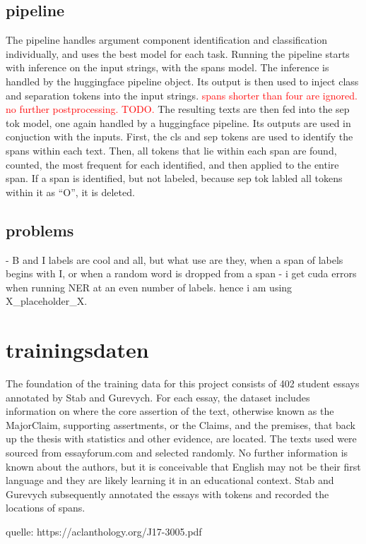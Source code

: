 \documentclass[12]{article}
\theoremstyle{mytheoremstyle}
\theoremstyle{mytheoremstyle}
\theoremstyle{myproblemstyle}
\begin{document}
  \subsection{pipeline} \label{pipeline}
  The pipeline handles argument component identification and classification individually, and uses the best model for each task. Running the pipeline starts with inference on the input strings, with the spans model. The inference is handled by the huggingface pipeline object. Its output is then used to inject class and separation tokens into the input strings. \textcolor{red}{spans shorter than four are ignored. no further postprocessing. TODO.} The resulting texts are then fed into the sep tok model, one again handled by a huggingface pipeline. 
  Its outputs are used in conjuction with the inputs. First, the cls and sep tokens are used to identify the spans within each text. Then, all tokens that lie within each span are found, counted, the most frequent for each identified, and then applied to the entire span. If a span is identified, but not labeled, because sep tok labled all tokens within it as ``O'', it is deleted.
  \subsection{problems} \label{problems}
  - B and I labels are cool and all, but what use are they, when a span of labels begins with I, or when a random word is dropped from a span
  - i get cuda errors when running NER at an even number of labels. hence i am using X\_placeholder\_X.
  \section{trainingsdaten\dotfill}
  The foundation of the training data for this project consists of 402 student essays annotated by Stab and Gurevych. For each essay, the dataset includes information on where the core assertion of the text, otherwise known as the MajorClaim, supporting assertments, or the Claims, and the premises, that back up the thesis with statistics and other evidence, are located. 
The texts used were sourced from essayforum.com and selected randomly. No further information is known about the authors, but it is conceivable that English may not be their first language and they are likely learning it in an educational context.
Stab and Gurevych subsequently annotated the essays with tokens and recorded the locations of spans.

  quelle: https://aclanthology.org/J17-3005.pdf
\end{document}
